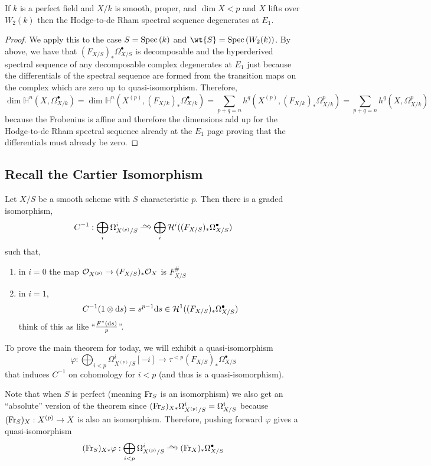 \documentclass[12pt]{article}
\begin{document}
\begin{cor}
If $k$ is a perfect field and $X/k$ is smooth, proper, and $\dim{X} < p$ and $X$ lifts over $W_2(k)$ then the Hodge-to-de Rham spectral sequence degenerates at $E_1$. 
\end{cor}

\begin{proof}
We apply this to the case $S = \mathrm{Spec}\left( k \right)$ and $\wt{S} = \Spec{W_2(k)}$. By above, we have that $(F_{X/S})_* \Omega^\bullet_{X/S}$ is decomposable and the hyperderived spectral sequence of any decomposable complex degenerates at $E_1$ just because the differentials of the spectral sequence are formed from the transition maps on the complex which are zero up to quasi-isomorphism. Therefore,
\[ \dim \mathbb{H}^n(X, \Omega_{X/k}^\bullet) = \dim \mathbb{H}^n(X^{(p)}, (F_{X/k})_* \Omega_{X/k}^\bullet) = \sum_{p + q = n} h^q(X^{(p)}, (F_{X/k})_* \Omega^p_{X/k}) = \sum_{p + q = n} h^q(X, \Omega^p_{X/k}) \]
because the Frobenius is affine and therefore the dimensions add up for the Hodge-to-de Rham spectral sequence already at the $E_1$ page proving that the differentials must already be zero.
\end{proof}

\subsection{Recall the Cartier Isomorphism}

Let $X/S$ be a smooth scheme with $S$ characteristic $p$. Then there is a graded isomorphism,
\[ C^{-1} : \bigoplus_{i} \Omega^i_{X^{(p)}/S} \iso \bigoplus_i \mathcal{H}^i((F_{X/S})_* \Omega^\bullet_{X/S}) \]
such that,
\begin{enumerate}
\item in $i = 0$ the map $\mathcal{O}_{X^{(p)}} \to (F_{X/S})_* \mathcal{O}_{X}$ is $F_{X/S}^{\#}$
\item in $i = 1$,
\[ C^{-1}(1 \otimes \mathrm{d}{s}) = s^{p-1} \mathrm{d}{s} \in \mathcal{H}^1((F_{X/S})_* \Omega^\bullet_{X/S}) \]
think of this as like ``$\frac{F^*(\mathrm{d}{s})}{p}$''.  
\end{enumerate}

To prove the main theorem for today, we will exhibit a quasi-isomorphism
\[ \varphi : \bigoplus_{i < p} \Omega^i_{X^{(p)}/S}[-i] \to \tau^{< p} (F_{X/S})_* \Omega^\bullet_{X/S} \]
that induces $C^{-1}$ on cohomology for $i < p$ (and thus is a quasi-isomorphism).

\begin{rmk}
Note that when $S$ is perfect (meaning $\mathrm{Fr}_S$ is an isomorphism) we also get an ``absolute'' version of the theorem since $(\mathrm{Fr}_S)_{X*} \Omega_{X^{(p)}/S}^i = \Omega_{X/S}^i$ because $(\mathrm{Fr}_S)_{X} : X^{(p)} \to X$ is also an isomorphism. Therefore, pushing forward $\varphi$ gives a quasi-isomorphism
\[ (\Fr_S)_{X*} \varphi : \bigoplus_{i < p} \Omega^i_{X^{(p)}/S} \iso (\Fr_X)_* \Omega_{X/S}^{\bullet} \]
\end{rmk}
\end{document}
